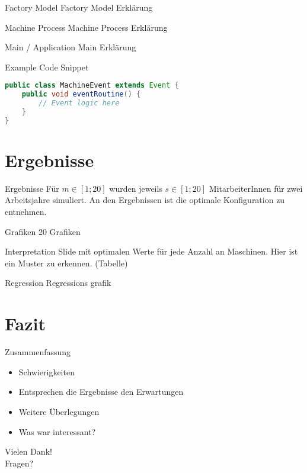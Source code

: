 \documentclass{beamer}
\begin{document}
    \begin{frame}{Factory Model}
        Factory Model Erklärung
    \end{frame}

    \begin{frame}{Machine Process}
        Machine Process Erklärung
    \end{frame}

    \begin{frame}{Main / Application}
        Main Erklärung
    \end{frame}

    \begin{frame}[fragile]{Example Code Snippet}
        \begin{lstlisting}[language=Java, caption=Basic event class]
public class MachineEvent extends Event {
    public void eventRoutine() {
        // Event logic here
    }
}
        \end{lstlisting}
    \end{frame}

    \section{Ergebnisse}
    \begin{frame}{Ergebnisse}
        Für $m\in [1; 20]$ wurden jeweils $s\in[1;20]$ MitarbeiterInnen für zwei Arbeitsjahre simuliert.
        An den Ergebnissen ist die optimale Konfiguration zu entnehmen.
    \end{frame}

    \begin{frame}{Grafiken}
        20 Grafiken
    \end{frame}

    \begin{frame}{Interpretation}
        Slide mit optimalen Werte für jede Anzahl an Maschinen.
        Hier ist ein Muster zu erkennen.
        (Tabelle)
    \end{frame}

    \begin{frame}{Regression}
        Regressions grafik
    \end{frame}

    \section{Fazit}
    \begin{frame}{Zusammenfassung}
        \begin{itemize}
            \item Schwierigkeiten
            \item Entsprechen die Ergebnisse den Erwartungen
            \item Weitere Überlegungen
            \item Was war interessant?
        \end{itemize}
    \end{frame}

    \begin{frame}[standout]
        Vielen Dank!\\
        Fragen?
    \end{frame}
\end{document}
